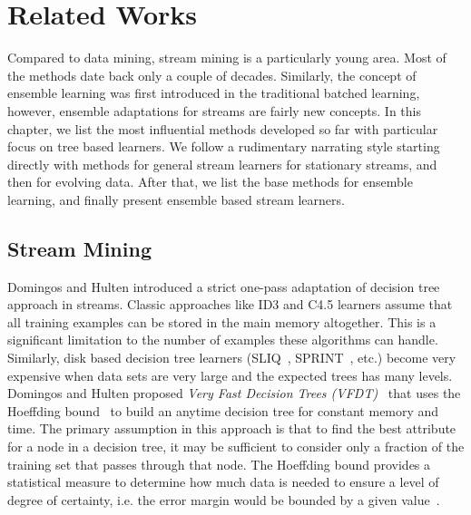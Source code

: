 \section{Related Works}
\label{chp:relworks}
Compared to data mining, stream mining is a particularly young area. Most of the methods date back only a couple of decades. Similarly, the concept of ensemble learning was first introduced in the traditional batched learning, however, ensemble adaptations for streams are fairly new concepts. In this chapter, we list the most influential methods developed so far with particular focus on tree based learners. We follow a rudimentary narrating style starting directly with methods for general stream learners for stationary streams, and then for evolving data. After that, we list the base methods for ensemble learning, and finally present ensemble based stream learners.

\subsection{Stream Mining}

Domingos and Hulten introduced a strict one-pass adaptation of decision tree~\cite{breiman84:dt,quinlan93:c45} approach in streams. Classic approaches like ID3 and C4.5 learners assume that all training examples can be stored in the main memory altogether. This is a significant limitation to the number of examples these algorithms can handle. Similarly, disk based decision tree learners (SLIQ~\cite{mehta96:sliq}, SPRINT~\cite{shafer96:sprint}, etc.) become very expensive when data sets are very large and the expected trees has many levels. Domingos and Hulten proposed \textit{Very Fast Decision Trees (VFDT)}~\cite{domingos00:vfdt} that uses the Hoeffding bound~\cite{hoeffding63:bound} to build an anytime decision tree for constant memory and time. The primary assumption in this approach is that to find the best attribute for a node in a decision tree, it may be sufficient to consider only a fraction of the training set that passes through that node. The Hoeffding bound provides a statistical measure to determine how much data is needed to ensure a level of degree of certainty, i.e. the error margin would be bounded by a given value~\cite{catlett91:thesis}.

